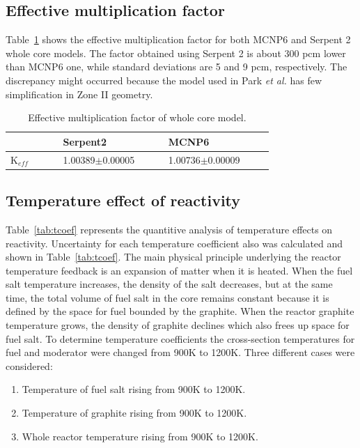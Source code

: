 \documentclass{anstrans}
\begin{document}
\subsection{Effective multiplication factor}
Table~\ref{tab:keff} shows the effective multiplication factor for both MCNP6 and Serpent 2 whole core models. The factor obtained using Serpent 2 is about 300 pcm lower than MCNP6 one, while standard deviations are 5 and 9 pcm, respectively. The discrepancy might occurred because the model used in Park \emph{et al.} has few simplification in Zone II geometry.
\captionsetup[table]{
  labelsep = newline,
  name = TABLE, 
  justification=justified,
  singlelinecheck=false,%
  labelsep=colon,%
  skip = \medskipamount}
\begin{table}[h!]
\caption{Effective multiplication factor of whole core model.}
\begin{tabular}{p{0.15\linewidth} p{0.3\linewidth} p{0.3\linewidth}} \toprule
      & Serpent2      & MCNP6 \cite{park_whole_2015}          
\\ \midrule
K$_{eff}$  & 1.00389$\pm$0.00005 & 1.00736$\pm$0.00009
\\
\bottomrule
\end{tabular}
  \label{tab:keff}
\end{table}
\subsection{Temperature effect of reactivity}
Table~\ref{tab:tcoef} represents the quantitive analysis of temperature effects on reactivity. Uncertainty for each temperature coefficient also was calculated and shown in Table~\ref{tab:tcoef}. The main physical principle underlying the reactor temperature feedback is an expansion of matter when it is heated. When the fuel salt temperature increases, the density of the salt decreases, but at the same time, the total volume of fuel salt in the core remains constant because it is defined by the space for fuel bounded by the graphite. When the reactor graphite temperature grows, the density of graphite declines which also frees up space for fuel salt. To determine temperature coefficients the cross-section temperatures for fuel and moderator were changed from 900K to 1200K. Three different cases were considered:
\begin{enumerate}  
\item Temperature of fuel salt rising from 900K to 1200K.
\item Temperature of graphite rising from 900K to 1200K. 
\item Whole reactor temperature rising from 900K to 1200K.
\end{enumerate}
\end{document}
